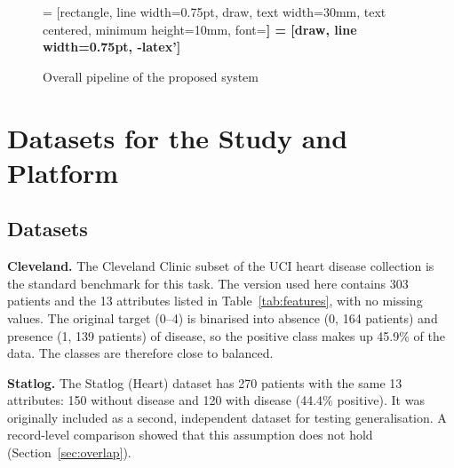 \documentclass[MTech]{ugthesis}
\begin{document}
\begin{figure}[htpb]
\centering
{} = [rectangle, line width=0.75pt, draw, text width=30mm, text centered, minimum height=10mm, font=\footnotesize\bfseries]
 = [draw, line width=0.75pt, -latex']
\caption{Overall pipeline of the proposed system}
\label{fig:arch}
\end{figure}

\section{Datasets for the Study and Platform}
\subsection{Datasets}
\textbf{Cleveland.} The Cleveland Clinic subset of the UCI heart disease collection \citep{detrano1989,uci_heart} is the standard benchmark for this task. The version used here contains 303 patients and the 13 attributes listed in Table~\ref{tab:features}, with no missing values. The original target (0--4) is binarised into absence (0, 164 patients) and presence (1, 139 patients) of disease, so the positive class makes up 45.9\% of the data. The classes are therefore close to balanced.

\textbf{Statlog.} The Statlog (Heart) dataset \citep{uci_statlog} has 270 patients with the same 13 attributes: 150 without disease and 120 with disease (44.4\% positive). It was originally included as a second, independent dataset for testing generalisation. A record-level comparison showed that this assumption does not hold (Section~\ref{sec:overlap}).
\end{document}
